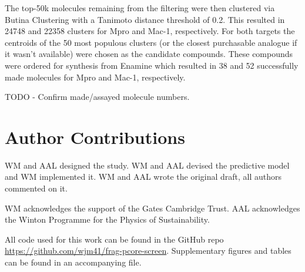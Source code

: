 The top-50k molecules remaining from the filtering were then clustered via Butina Clustering \cite{Butina1999Clustering} with a Tanimoto distance threshold of 0.2. This resulted in 24748 and 22358 clusters for Mpro and Mac-1, respectively. For both targets the centroids of the 50 most populous clusters (or the closest purchasable analogue if it wasn't available) were chosen as the candidate compounds. These compounds were ordered for synthesis from Enamine which resulted in 38 and 52 successfully made molecules for Mpro and Mac-1, respectively.

TODO - Confirm made/assayed molecule numbers.

\section{Author Contributions}
WM and AAL designed the study. WM and AAL devised the predictive model and WM implemented it. WM and AAL wrote the original draft, all authors commented on it.

\begin{acknowledgement}

WM acknowledges the support of the Gates Cambridge Trust. AAL acknowledges the Winton Programme for the Physics of Sustainability.

\end{acknowledgement}

\begin{suppinfo}

All code used for this work can be found in the GitHub repo \url{https://github.com/wjm41/frag-pcore-screen}. Supplementary figures and tables can be found in an accompanying file.

\end{suppinfo}

% 